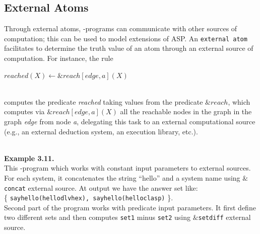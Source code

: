\documentclass[14pt,a4paper, titlepage]{article}
\begin{document}
\subsection{External Atoms}
Through external atoms, \hex{}-programs can communicate with other sources of computation; this can be used to model extensions of ASP.  
An \texttt{external atom} facilitates to determine the truth value of an atom through an external source of computation. For instance, the rule \\ \centerline{ \textit{$reached(X) \leftarrow \&reach[edge,a](X)$}}
\\computes the predicate \textit{reached} taking values from the predicate $\&reach$, which computes via \textit{$\&reach[edge,a](X)$} all the reachable nodes in the graph in the graph \textit{edge} from node \textit{a}, delegating this task to an external computational source (e.g., an external deduction system, an execution library, etc.). 

\textbf{\\Example 3.11.}
\\      
This \hex{}-program  which works with constant input parameters  to external sources. For each system, it concatenates the string \enquote{hello} and a system name using \texttt{$\&$concat} external source. At output we have the answer set like:\\ \{ \texttt{sayhello(hellodlvhex), sayhello(helloclasp)} \}. 
\\Second part of the program works with predicate input parameters. It first define two different sets and then computes \texttt{set1} minus \texttt{set2} using \texttt{$\&$setdiff} external source.




\newpage
\end{document}
